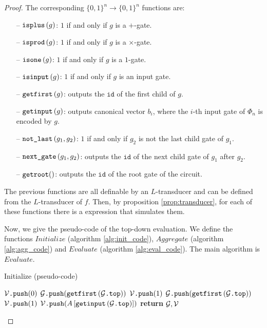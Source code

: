 \begin{proof}
    The corresponding $\lbrace 0,1 \rbrace^n\rightarrow\lbrace 0,1 \rbrace^n$ functions are:

    \begin{itemize}
        \item[--] $\texttt{isplus}\left( g \right)$: $1$ if and only if $g$ is a $+$-gate.
        \item[--] $\texttt{isprod}\left(g \right)$: $1$ if and only if $g$ is a $\times$-gate.
        \item[--] $\texttt{isone}\left(g \right)$: $1$ if and only if $g$ is a $1$-gate.
        \item[--] $\texttt{isinput}\left(g \right)$: $1$ if and only if $g$ is an input gate.
        \item[--] $\texttt{getfirst}\left(g \right)$: outputs the $\texttt{id}$ of the first child of $g$.
        \item[--] $\texttt{getinput}\left(g \right)$: outputs canonical vector $b_i$, where the $i$-th input gate of $\Phi_n$ is encoded by $g$.
        \item[--] $\texttt{not{\_}last}\left(g_1,g_2 \right)$: $1$ if and only if $g_2$ is not the last child gate of $g_1$.
        \item[--] $\texttt{next{\_}gate}\left(g_1, g_2 \right)$: outputs the $\texttt{id}$ of the next child gate of $g_1$ after $g_2$.
        \item[--] $\texttt{getroot}()$: outputs the $\texttt{id}$ of the root gate of the circuit.
    \end{itemize}

    The previous functions are all definable by an $L$-transducer and can be defined from the $L$-transducer of $f$. Then, by proposition \ref{prop:transducer}, for each of these functions there is a \langfor expression that simulates them.

    Now, we give the pseudo-code of the top-down evaluation. We define the functions $Initialize$ (algorithm \ref{alg:init_code}), $Aggregate$ (algorithm \ref{alg:agg_code}) and $Evaluate$ (algorithm \ref{alg:eval_code}). The main algorithm is $Evaluate$.

    \begin{algorithm}
    \caption{Initialize (pseudo-code)}\label{alg:init_code}
    \begin{algorithmic}[1]
        \If{$\isplus{\gettop{\cG}}$}
            \State $\mathcal{V}\texttt{.push}(0)$
            \State $\mathcal{G}\texttt{.push}(\texttt{getfirst}\left(\mathcal{G}\texttt{.top} \right))$
        \ElsIf{$\isprod{\gettop{\cG}}$}
            \State $\mathcal{V}\texttt{.push}(1)$
            \State $\mathcal{G}\texttt{.push}(\texttt{getfirst}\left(\mathcal{G}\texttt{.top} \right))$
        \ElsIf{$\isone{\gettop{\cG}}$}
            \State $\mathcal{V}\texttt{.push}(1)$
        \ElsIf{$\isinput{\gettop{\cG}}$}
            \State $\mathcal{V}\texttt{.push}(A\left[ \texttt{getinput}\left(\mathcal{G}\texttt{.top} \right) \right])$
        \EndIf
        \State \textbf{return} $\mathcal{G}, \mathcal{V}$
    \EndFunction
    \end{algorithmic}
    \end{algorithm}


\end{proof}
